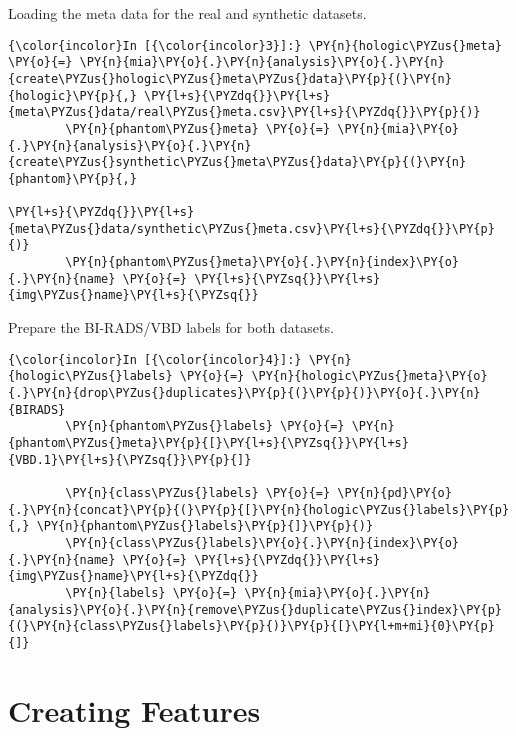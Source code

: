     Loading the meta data for the real and synthetic datasets.

    \begin{Verbatim}[commandchars=\\\{\}]
{\color{incolor}In [{\color{incolor}3}]:} \PY{n}{hologic\PYZus{}meta} \PY{o}{=} \PY{n}{mia}\PY{o}{.}\PY{n}{analysis}\PY{o}{.}\PY{n}{create\PYZus{}hologic\PYZus{}meta\PYZus{}data}\PY{p}{(}\PY{n}{hologic}\PY{p}{,} \PY{l+s}{\PYZdq{}}\PY{l+s}{meta\PYZus{}data/real\PYZus{}meta.csv}\PY{l+s}{\PYZdq{}}\PY{p}{)}
        \PY{n}{phantom\PYZus{}meta} \PY{o}{=} \PY{n}{mia}\PY{o}{.}\PY{n}{analysis}\PY{o}{.}\PY{n}{create\PYZus{}synthetic\PYZus{}meta\PYZus{}data}\PY{p}{(}\PY{n}{phantom}\PY{p}{,}
                                                               \PY{l+s}{\PYZdq{}}\PY{l+s}{meta\PYZus{}data/synthetic\PYZus{}meta.csv}\PY{l+s}{\PYZdq{}}\PY{p}{)}
        \PY{n}{phantom\PYZus{}meta}\PY{o}{.}\PY{n}{index}\PY{o}{.}\PY{n}{name} \PY{o}{=} \PY{l+s}{\PYZsq{}}\PY{l+s}{img\PYZus{}name}\PY{l+s}{\PYZsq{}}
\end{Verbatim}

    Prepare the BI-RADS/VBD labels for both datasets.

    \begin{Verbatim}[commandchars=\\\{\}]
{\color{incolor}In [{\color{incolor}4}]:} \PY{n}{hologic\PYZus{}labels} \PY{o}{=} \PY{n}{hologic\PYZus{}meta}\PY{o}{.}\PY{n}{drop\PYZus{}duplicates}\PY{p}{(}\PY{p}{)}\PY{o}{.}\PY{n}{BIRADS}
        \PY{n}{phantom\PYZus{}labels} \PY{o}{=} \PY{n}{phantom\PYZus{}meta}\PY{p}{[}\PY{l+s}{\PYZsq{}}\PY{l+s}{VBD.1}\PY{l+s}{\PYZsq{}}\PY{p}{]}

        \PY{n}{class\PYZus{}labels} \PY{o}{=} \PY{n}{pd}\PY{o}{.}\PY{n}{concat}\PY{p}{(}\PY{p}{[}\PY{n}{hologic\PYZus{}labels}\PY{p}{,} \PY{n}{phantom\PYZus{}labels}\PY{p}{]}\PY{p}{)}
        \PY{n}{class\PYZus{}labels}\PY{o}{.}\PY{n}{index}\PY{o}{.}\PY{n}{name} \PY{o}{=} \PY{l+s}{\PYZdq{}}\PY{l+s}{img\PYZus{}name}\PY{l+s}{\PYZdq{}}
        \PY{n}{labels} \PY{o}{=} \PY{n}{mia}\PY{o}{.}\PY{n}{analysis}\PY{o}{.}\PY{n}{remove\PYZus{}duplicate\PYZus{}index}\PY{p}{(}\PY{n}{class\PYZus{}labels}\PY{p}{)}\PY{p}{[}\PY{l+m+mi}{0}\PY{p}{]}
\end{Verbatim}

    \section{Creating Features}\label{creating-features}

